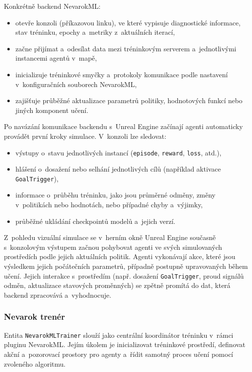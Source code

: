 Konkrétně backend NevarokML:

\begin{itemize}
	\item otevře konzoli (příkazovou linku), ve které vypisuje diagnostické informace, stav tréninku, epochy a~metriky z~aktuálních iterací,
	\item začne přijímat a~odesílat data mezi tréninkovým serverem a~jednotlivými instancemi agentů v~mapě,
	\item inicializuje tréninkové smyčky a~protokoly komunikace podle nastavení v~konfiguračních souborech NevarokML,
	\item zajišťuje průběžné aktualizace parametrů politiky, hodnotových funkcí nebo jiných komponent učení.
\end{itemize}

Po navázání komunikace backendu s~Unreal Engine začínají agenti automaticky provádět první kroky simulace. V~konzoli lze sledovat:

\begin{itemize}
	\item výstupy o~stavu jednotlivých instancí (\texttt{episode}, \texttt{reward}, \texttt{loss}, atd.),
	\item hlášení o~dosažení nebo selhání jednotlivých cílů (například aktivace \texttt{GoalTrigger}),
	\item informace o~průběhu tréninku, jako jsou průměrné odměny, změny v~politikách nebo hodnotách, nebo případné chyby a~výjimky,
	\item průběžné ukládání checkpointů modelů a~jejich verzí.
\end{itemize}

Z~pohledu vizuální simulace se v~herním okně Unreal Engine současně s~konzolovým výstupem začnou pohybovat agenti ve svých simulovaných prostředích podle jejich aktuálních politik. Agenti vykonávají akce, které jsou výsledkem jejich počátečních parametrů, případně postupně upravovaných během učení. Jejich interakce s~prostředím (např. dosažení \texttt{GoalTrigger}, proud signálů odměn, aktualizace stavových proměnných) se zpětně promítá do dat, která backend zpracovává a~vyhodnocuje.

\subsubsection{Nevarok trenér}

Entita \texttt{NevarokMLTrainer} slouží jako centrální koordinátor tréninku v~rámci pluginu NevarokML. Jejím úkolem je inicializovat tréninkové prostředí, definovat akční a~pozorovací prostory pro agenty a~řídit samotný proces učení pomocí zvoleného algoritmu.

